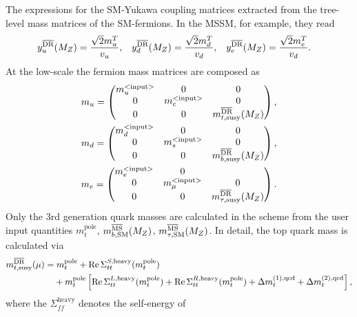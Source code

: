 The expressions for the SM-Yukawa coupling matrices extracted from the
tree-level mass matrices of the SM-fermions.  In the MSSM, for
example, they read
%
\begin{align}
  y_u^{\text{$\overline{\mbox{DR}}$}}(M_Z) &= \frac{\sqrt{2} m_{u}^T}{v_u} , &
  y_d^{\text{$\overline{\mbox{DR}}$}}(M_Z) &= \frac{\sqrt{2} m_{d}^T}{v_d} , &
  y_e^{\text{$\overline{\mbox{DR}}$}}(M_Z) &= \frac{\sqrt{2} m_{e}^T}{v_d}.
\end{align}
%
At the low-scale the fermion mass matrices are composed as
%
\begin{align}
  m_u =
  \begin{pmatrix}
    m_{u}^{\text{<input>}} & 0 & 0 \\
    0 & m_{c}^{\text{<input>}} & 0 \\
    0 & 0 & m_{t,\text{susy}}^{\text{$\overline{\mbox{DR}}$}}(M_Z)
  \end{pmatrix} ,\\
  m_d =
  \begin{pmatrix}
    m_{d}^{\text{<input>}} & 0 & 0 \\
    0 & m_{s}^{\text{<input>}} & 0 \\
    0 & 0 & m_{b,\text{susy}}^{\text{$\overline{\mbox{DR}}$}}(M_Z)
  \end{pmatrix} ,\\
  m_e =
  \begin{pmatrix}
    m_{e}^{\text{<input>}} & 0 & \\
    0 & m_{\mu}^{\text{<input>}} & 0 \\
    0 & 0 & m_{\tau,\text{susy}}^{\text{$\overline{\mbox{DR}}$}}(M_Z)
  \end{pmatrix}.
\end{align}
%
Only the 3rd generation quark masses are calculated in the \DRbar
scheme from the user input quantities $m_t^\text{pole}$,
$m_{b,\text{SM}}^{\text{$\overline{\mbox{MS}}$}}(M_Z)$,
$m_{\tau,\text{SM}}^{\text{$\overline{\mbox{MS}}$}}(M_Z)$.  In detail, the top quark
\DRbar mass is calculated via
%
\begin{align}
  \begin{split}
    m_{t,\text{susy}}^{\text{$\overline{\mbox{DR}}$}}(\mu) &= m_t^\text{pole} +
    \operatorname{Re}\Sigma_{tt}^{S,\text{heavy}}(m_t^\text{pole}) \\
    &\phantom{=\;} + m_t^\text{pole}
    \left[ \operatorname{Re}\Sigma_{tt}^{L,\text{heavy}}(m_t^\text{pole}) +
      \operatorname{Re}\Sigma_{tt}^{R,\text{heavy}}(m_t^\text{pole}) + \Delta
      m_t^{(1),\text{qcd}} + \Delta m_t^{(2),\text{qcd}} \right] ,
  \end{split}
\end{align}
%
where the $\Sigma_{ff}^\text{heavy}$ denotes the self-energy of
